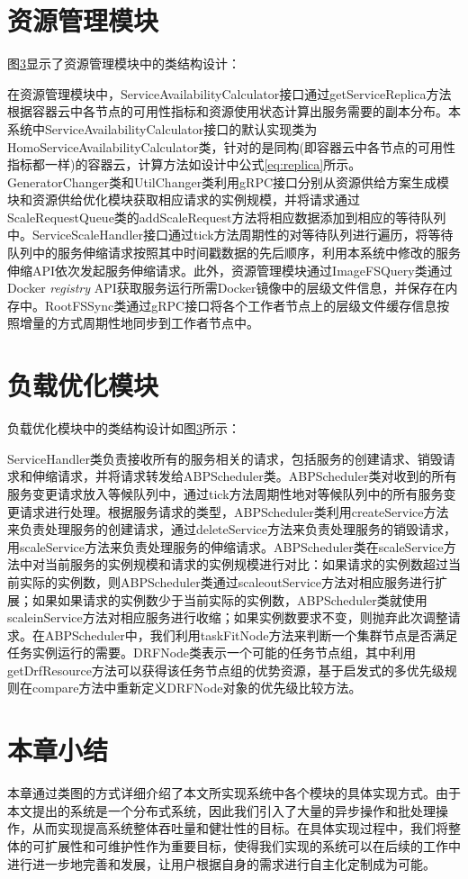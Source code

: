 \section{资源管理模块}
图\ref{}显示了资源管理模块中的类结构设计：

在资源管理模块中，ServiceAvailabilityCalculator接口通过getServiceReplica方法根据容器云中各节点的可用性指标和资源使用状态计算出服务需要的副本分布。本系统中ServiceAvailabilityCalculator接口的默认实现类为HomoServiceAvailabilityCalculator类，针对的是同构(即容器云中各节点的可用性指标都一样)的容器云，计算方法如设计中公式\ref{eq:replica}所示。GeneratorChanger类和UtilChanger类利用gRPC接口分别从资源供给方案生成模块和资源供给优化模块获取相应请求的实例规模，并将请求通过ScaleRequestQueue类的addScaleRequest方法将相应数据添加到相应的等待队列中。ServiceScaleHandler接口通过tick方法周期性的对等待队列进行遍历，将等待队列中的服务伸缩请求按照其中时间戳数据的先后顺序，利用本系统中修改的服务伸缩API依次发起服务伸缩请求。此外，资源管理模块通过ImageFSQuery类通过Docker \emph{registry} API获取服务运行所需Docker镜像中的层级文件信息，并保存在内存中。RootFSSync类通过gRPC接口将各个工作者节点上的层级文件缓存信息按照增量的方式周期性地同步到工作者节点中。

\section{负载优化模块}
负载优化模块中的类结构设计如图\ref{}所示：

ServiceHandler类负责接收所有的服务相关的请求，包括服务的创建请求、销毁请求和伸缩请求，并将请求转发给ABPScheduler类。ABPScheduler类对收到的所有服务变更请求放入等候队列中，通过tick方法周期性地对等候队列中的所有服务变更请求进行处理。根据服务请求的类型，ABPScheduler类利用createService方法来负责处理服务的创建请求，通过deleteService方法来负责处理服务的销毁请求，用scaleService方法来负责处理服务的伸缩请求。ABPScheduler类在scaleService方法中对当前服务的实例规模和请求的实例规模进行对比：如果请求的实例数超过当前实际的实例数，则ABPScheduler类通过scaleoutService方法对相应服务进行扩展；如果如果请求的实例数少于当前实际的实例数，ABPScheduler类就使用scaleinService方法对相应服务进行收缩；如果实例数要求不变，则抛弃此次调整请求。在ABPScheduler中，我们利用taskFitNode方法来判断一个集群节点是否满足任务实例运行的需要。DRFNode类表示一个可能的任务节点组，其中利用getDrfResource方法可以获得该任务节点组的优势资源，基于启发式的多优先级规则在compare方法中重新定义DRFNode对象的优先级比较方法。


\section{本章小结}
本章通过类图的方式详细介绍了本文所实现系统中各个模块的具体实现方式。由于本文提出的系统是一个分布式系统，因此我们引入了大量的异步操作和批处理操作，从而实现提高系统整体吞吐量和健壮性的目标。在具体实现过程中，我们将整体的可扩展性和可维护性作为重要目标，使得我们实现的系统可以在后续的工作中进行进一步地完善和发展，让用户根据自身的需求进行自主化定制成为可能。